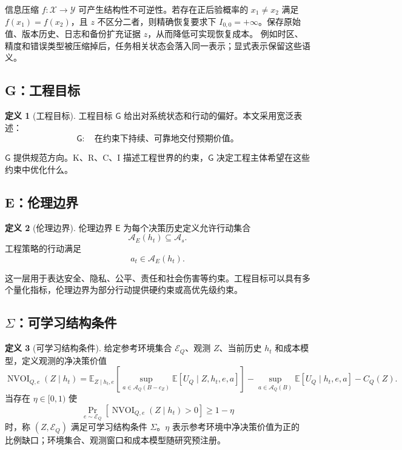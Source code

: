 \documentclass[11pt,a4paper]{ctexart}
\numberwithin{equation}{section}
\theoremstyle{definition}
\newtheorem{definition}{定义}[section]
\theoremstyle{plain}
\newcommand{\Goal}{\mathsf{G}}
\newcommand{\Eth}{\mathsf{E}}
\newcommand{\Learn}{\Sigma}
\begin{document}
信息压缩 $f:\mathcal X\to\mathcal Y$ 可产生结构性不可逆性。若存在正后验概率的
$x_1\ne x_2$ 满足 $f(x_1)=f(x_2)$，且 $z$ 不区分二者，则精确恢复要求下
$I_{0,0}=+\infty$。保存原始值、版本历史、日志和备份扩充证据 $z$，从而降低可实现恢复成本。
例如时区、精度和错误类型被压缩掉后，任务相关状态会落入同一表示；显式表示保留这些语义。

\subsection{G：工程目标}

\begin{definition}[工程目标]
工程目标 $\Goal$ 给出对系统状态和行动的偏好。本文采用宽泛表述：
\[
\Goal:\quad
\text{在约束下持续、可靠地交付预期价值。}
\]
\end{definition}

$\Goal$ 提供规范方向。K、R、C、I 描述工程世界的约束，$\Goal$ 决定工程主体希望在这些约束中优化什么。

\subsection{E：伦理边界}

\begin{definition}[伦理边界]
伦理边界 $\Eth$ 为每个决策历史定义允许行动集合
\[
\mathcal{A}_E(h_t)\subseteq\mathcal{A}_s.
\]
工程策略的行动满足
\[
a_t\in\mathcal{A}_E(h_t).
\]
\end{definition}

这一层用于表达安全、隐私、公平、责任和社会伤害等约束。工程目标可以具有多个量化指标，伦理边界为部分行动提供硬约束或高优先级约束。

\subsection{\texorpdfstring{$\Sigma$}{Sigma}：可学习结构条件}

\begin{definition}[可学习结构条件]
给定参考环境集合 $\mathcal E_Q$、观测 $Z$、当前历史 $h_t$ 和成本模型，定义观测的净决策价值
\begin{equation}
\operatorname{NVOI}_{Q,e}(Z\mid h_t)
=
\mathbb E_{Z\mid h_t,e}
\left[
\sup_{a\in\mathcal A_Q(B-c_Z)}
\mathbb E[U_Q\mid Z,h_t,e,a]
\right]
-
\sup_{a\in\mathcal A_Q(B)}
\mathbb E[U_Q\mid h_t,e,a]
-
C_Q(Z).
\label{eq:nvoi}
\end{equation}
当存在 $\eta\in[0,1)$ 使
\[
\Pr_{e\sim\mathcal E_Q}
\left[
\operatorname{NVOI}_{Q,e}(Z\mid h_t)>0
\right]\ge1-\eta
\]
时，称 $(Z,\mathcal E_Q)$ 满足可学习结构条件 $\Learn$。$\eta$ 表示参考环境中净决策价值为正的
比例缺口；环境集合、观测窗口和成本模型随研究预注册。
\end{definition}
\end{document}
